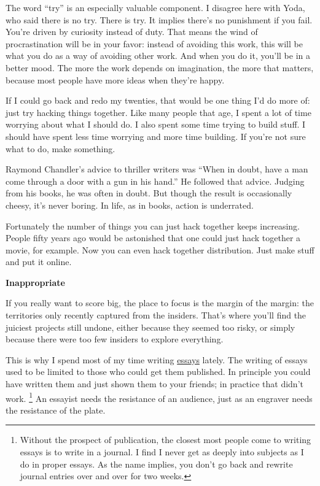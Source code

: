 The word ``try'' is an especially valuable component. I disagree here
with Yoda, who said there is no try. There is try. It implies there's no
punishment if you fail. You're driven by curiosity instead of duty. That
means the wind of procrastination will be in your favor: instead of
avoiding this work, this will be what you do as a way of avoiding other
work. And when you do it, you'll be in a better mood. The more the work
depends on imagination, the more that matters, because most people have
more ideas when they're happy.

If I could go back and redo my twenties, that would be one thing I'd do
more of: just try hacking things together. Like many people that age, I
spent a lot of time worrying about what I should do. I also spent some
time trying to build stuff. I should have spent less time worrying and
more time building. If you're not sure what to do, make something.

Raymond Chandler's advice to thriller writers was ``When in doubt, have
a man come through a door with a gun in his hand.'' He followed that
advice. Judging from his books, he was often in doubt. But though the
result is occasionally cheesy, it's never boring. In life, as in books,
action is underrated.

Fortunately the number of things you can just hack together keeps
increasing. People fifty years ago would be astonished that one could
just hack together a movie, for example. Now you can even hack together
distribution. Just make stuff and put it online.

\textbf{Inappropriate}

If you really want to score big, the place to focus is the margin of the
margin: the territories only recently captured from the insiders. That's
where you'll find the juiciest projects still undone, either because
they seemed too risky, or simply because there were too few insiders to
explore everything.

This is why I spend most of my time writing \href{essay.html}{essays}
lately. The writing of essays used to be limited to those who could get
them published. In principle you could have written them and just shown
them to your friends; in practice that didn't work.
\footnote{Without the prospect of publication, the closest most people
come to writing essays is to write in a journal. I find I never get as
deeply into subjects as I do in proper essays. As the name implies, you
don't go back and rewrite journal entries over and over for two weeks.} An essayist needs the resistance of an audience,
just as an engraver needs the resistance of the plate.

